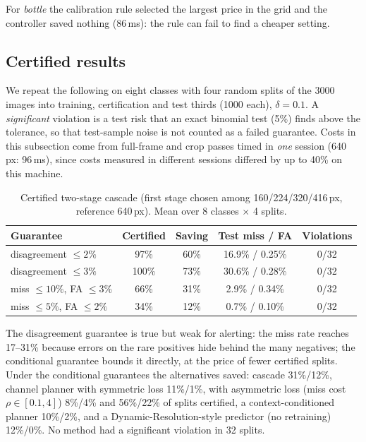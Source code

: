 \documentclass[11pt]{article}
\begin{document}
For \emph{bottle} the calibration rule selected the largest price in the grid and the controller
saved nothing (86\,ms): the rule can fail to find a cheaper setting.

\subsection{Certified results}
\label{sec:certres}
We repeat the following on eight classes with four random splits of the 3000 images into training,
certification and test thirds (1000 each), $\delta{=}0.1$. A \emph{significant} violation is a test risk
that an exact binomial test (5\%) finds above the tolerance, so that test-sample noise is not counted as
a failed guarantee. Costs in this subsection come from full-frame and crop passes timed in \emph{one} session
(640\,px: 96\,ms), since costs measured in different sessions differed by up to 40\% on this machine.

\begin{table}[h]
\centering
\caption{Certified two-stage cascade (first stage chosen among 160/224/320/416\,px, reference 640\,px).
Mean over 8 classes $\times$ 4 splits.}
\label{tab:cert}
\begin{tabular}{lcccc}
\toprule
\textbf{Guarantee} & \textbf{Certified} & \textbf{Saving} & \textbf{Test miss / FA} & \textbf{Violations} \\
\midrule
disagreement $\le 2\%$ & 97\% & 60\% & 16.9\% / 0.25\% & 0/32 \\
disagreement $\le 3\%$ & 100\% & 73\% & 30.6\% / 0.28\% & 0/32 \\
miss $\le 10\%$, FA $\le 3\%$ & 66\% & 31\% & 2.9\% / 0.34\% & 0/32 \\
miss $\le 5\%$, FA $\le 2\%$ & 34\% & 12\% & 0.7\% / 0.10\% & 0/32 \\
\bottomrule
\end{tabular}
\end{table}

The disagreement guarantee is true but weak for alerting: the miss rate reaches 17--31\% because errors on
the rare positives hide behind the many negatives; the conditional guarantee bounds it directly, at the price
of fewer certified splits. Under the conditional guarantees the alternatives saved:
cascade 31\%/12\%, channel planner with symmetric loss 11\%/1\%, with asymmetric loss (miss cost $\rho\in[0.1,4]$)
8\%/4\% and 56\%/22\% of splits certified, a context-conditioned planner 10\%/2\%, and a Dynamic-Resolution-style
predictor (no retraining) 12\%/0\%. No method had a significant violation in 32 splits.
\end{document}
